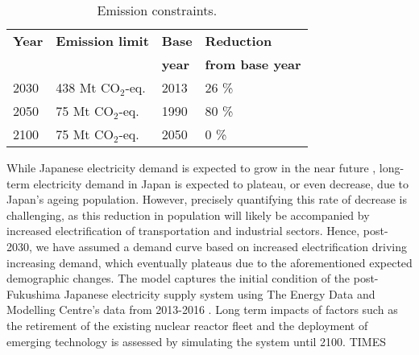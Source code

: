 \begin{table}[H]
\centering
	\caption{Emission constraints.}
	\vspace{0.1in}
	\begin{tabularx}{0.6\textwidth}{p{} p{}p{} p{}}
		\hline
\textbf{Year} & \textbf{Emission limit} & \textbf{Base} & \textbf{Reduction} \\
 & & \textbf{year} & \textbf{from base year} \\
\hline
2030 & 438 Mt CO$_2$-eq. & 2013 & 26 \% \\
2050 & 75 Mt CO$_2$-eq. & 1990 & 80 \% \\
2100 & 75 Mt CO$_2$-eq. & 2050 & 0 \% \\
\hline 
	\end{tabularx}
\label{co2-limits}
\end{table}

While Japanese electricity demand is expected to grow in the near future  \cite{noauthor_electricity_2019}, long-term electricity demand in Japan is expected to plateau, or even decrease, due to Japan's ageing population. However, precisely quantifying this rate of decrease is challenging, as this reduction in population will likely be accompanied by increased electrification of transportation and industrial sectors. Hence, post-2030, we have assumed a demand curve based on increased electrification driving increasing demand, which eventually plateaus due to the aforementioned expected demographic changes. The model captures the initial condition of the post-Fukushima Japanese electricity supply system using \DIFaddbegin {}\DIFaddend The Energy Data and Modelling Centre's data from 2013-2016 \cite{the_institute_of_energy_economics_japan_energy_2018}. Long term impacts of factors such as the retirement of the existing nuclear reactor fleet and the deployment of emerging technology is assessed by simulating the system until 2100.  \DIFaddbegin {}\gls{TIMES} 

